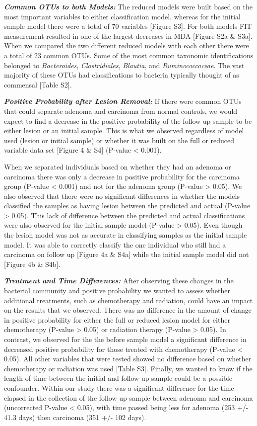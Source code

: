 \documentclass[12pt,]{article}
\begin{document}
\textbf{\emph{Common OTUs to both Models:}} The reduced models were
built based on the most important variables to either classification
model. whereas for the initial sample model there were a total of 70
variables {[}Figure S3{]}. For both models FIT measurement resulted in
one of the largest decreases in MDA {[}Figure S2a \& S3a{]}. When we
compared the two different reduced models with each other there were a
total of 23 common OTUs. Some of the most common taxonomic
identifications belonged to \emph{Bacteroides}, \emph{Clostridiales},
\emph{Blautia}, and \emph{Ruminococcaceae}. The vast majority of these
OTUs had classifications to bacteria typically thought of as commensal
{[}Table S2{]}.

\textbf{\emph{Positive Probability after Lesion Removal:}} If there were
common OTUs that could separate adenoma and carcinoma from normal
controls, we would expect to find a decrease in the positive probability
of the follow up sample to be either lesion or an initial sample. This
is what we observed regardless of model used (lesion or initial sample)
or whether it was built on the full or reduced variable data set
{[}Figure 4 \& S4{]} (P-value \textless{} 0.001).

When we separated individuals based on whether they had an adenoma or
carcinoma there was only a decrease in positive probability for the
carcinoma group (P-value \textless{} 0.001) and not for the adenoma
group (P-value \textgreater{} 0.05). We also observed that there were no
significant differences in whether the models classified the samples as
having lesion between the predicted and actual (P-value \textgreater{}
0.05). This lack of difference between the predicted and actual
classifications were also observed for the initial sample model (P-value
\textgreater{} 0.05). Even though the lesion model was not as accurate
in classifying samples as the initial sample model. It was able to
correctly classify the one individual who still had a carcinoma on
follow up {[}Figure 4a \& S4a{]} while the initial sample model did not
{[}Figure 4b \& S4b{]}.

\textbf{\emph{Treatment and Time Differences:}} After observing these
changes in the bacterial community and positive probability we wanted to
assess whether additional treatments, such as chemotherapy and
radiation, could have an impact on the results that we observed. There
was no difference in the amount of change in positive probability for
either the full or reduced lesion model for either chemotherapy (P-value
\textgreater{} 0.05) or radiation therapy (P-value \textgreater{} 0.05).
In contrast, we observed for the the before sample model a significant
difference in decreased positive probability for those treated with
chemotherapy (P-value \textless{} 0.05). All other variables that were
tested showed no difference based on whether chemotherapy or radiation
was used {[}Table S3{]}. Finally, we wanted to know if the length of
time between the initial and follow up sample could be a possible
confounder. Within our study there was a significant difference for the
time elapsed in the collection of the follow up sample between adenoma
and carcinoma (uncorrected P-value \textless{} 0.05), with time passed
being less for adenoma (253 +/- 41.3 days) then carcinoma (351 +/- 102
days).
\end{document}

